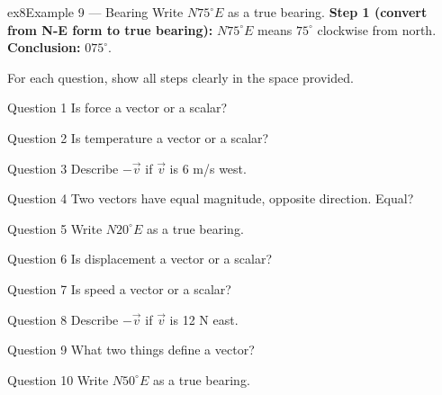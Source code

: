 \documentclass[11pt]{article}
\begin{document}
\begin{example}{ex8}{Example 9 --- Bearing}
Write $N75^\circ E$ as a true bearing.\soln
\textbf{Step 1 (convert from N-E form to true bearing):} $N75^\circ E$ means $75^\circ$ clockwise from north.\\[3pt]
\textbf{Conclusion:} $075^\circ$.
\end{example}

\clearpage
{}
For each question, show all steps clearly in the space provided.

\begin{qbox}{Question 1}
Is force a vector or a scalar?\workspace{2.4cm}
\end{qbox}

\begin{qbox}{Question 2}
Is temperature a vector or a scalar?\workspace{2.4cm}
\end{qbox}

\begin{qbox}{Question 3}
Describe $-\vec v$ if $\vec v$ is 6 m/s west.\workspace{2.4cm}
\end{qbox}

\begin{qbox}{Question 4}
Two vectors have equal magnitude, opposite direction. Equal?\workspace{2.4cm}
\end{qbox}

\begin{qbox}{Question 5}
Write $N20^\circ E$ as a true bearing.\workspace{2.4cm}
\end{qbox}

\begin{qbox}{Question 6}
Is displacement a vector or a scalar?\workspace{2.4cm}
\end{qbox}

\begin{qbox}{Question 7}
Is speed a vector or a scalar?\workspace{2.4cm}
\end{qbox}

\begin{qbox}{Question 8}
Describe $-\vec v$ if $\vec v$ is 12 N east.\workspace{2.4cm}
\end{qbox}

\begin{qbox}{Question 9}
What two things define a vector?\workspace{2.4cm}
\end{qbox}

\begin{qbox}{Question 10}
Write $N50^\circ E$ as a true bearing.\workspace{2.4cm}
\end{qbox}
\end{document}
